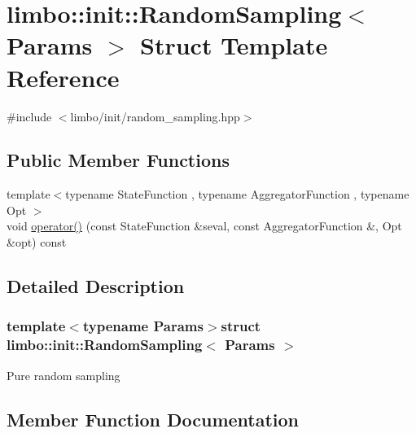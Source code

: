 \hypertarget{structlimbo_1_1init_1_1_random_sampling}{}\section{limbo\+:\+:init\+:\+:Random\+Sampling$<$ Params $>$ Struct Template Reference}
\label{structlimbo_1_1init_1_1_random_sampling}


{\ttfamily \#include $<$limbo/init/random\+\_\+sampling.\+hpp$>$}

\subsection*{Public Member Functions}
\begin{DoxyCompactItemize}
\item 
{\footnotesize template$<$typename State\+Function , typename Aggregator\+Function , typename Opt $>$ }\\void \hyperlink{structlimbo_1_1init_1_1_random_sampling_a4173b31aa6453a68f43aa7d24fbd0ca9}{operator()} (const State\+Function \&seval, const Aggregator\+Function \&, Opt \&opt) const 
\end{DoxyCompactItemize}


\subsection{Detailed Description}
\subsubsection*{template$<$typename Params$>$struct limbo\+::init\+::\+Random\+Sampling$<$ Params $>$}

Pure random sampling 

\subsection{Member Function Documentation}
\hypertarget{structlimbo_1_1init_1_1_random_sampling_a4173b31aa6453a68f43aa7d24fbd0ca9}{}
